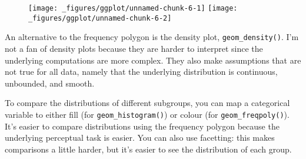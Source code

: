 \begin{Shaded}
\begin{Highlighting}[]
\StringTok{ }
\StringTok{  }\NormalTok{(} \NormalTok{)}
\StringTok{ }
\StringTok{  }\NormalTok{(} \NormalTok{)}
\end{Highlighting}
\end{Shaded}

\begin{figure}[H]
  \texttt{[image: \_figures/ggplot/unnamed-chunk-6-1]}%
  \texttt{[image: \_figures/ggplot/unnamed-chunk-6-2]}
\end{figure}

An alternative to the frequency polygon is the density plot,
\texttt{geom\_density()}. I'm not a fan of density plots because they
are harder to interpret since the underlying computations are more
complex. They also make assumptions that are not true for all data,
namely that the underlying distribution is continuous, unbounded, and
smooth.

To compare the distributions of different subgroups, you can map a
categorical variable to either fill (for \texttt{geom\_histogram()}) or
colour (for \texttt{geom\_freqpoly()}). It's easier to compare
distributions using the frequency polygon because the underlying
perceptual task is easier. You can also use facetting: this makes
comparisons a little harder, but it's easier to see the distribution of
each group.

\begin{Shaded}
\begin{Highlighting}[]
 \StringTok{ }
\StringTok{  }\NormalTok{(} \NormalTok{)}
 \StringTok{ }
\StringTok{  }\NormalTok{(} \NormalTok{) +}\StringTok{ }
\StringTok{  } \NormalTok{)}
\end{Highlighting}
\end{Shaded}

